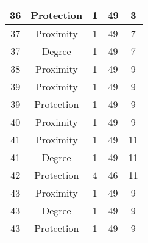 \documentclass[results.tex]{subfiles}
\begin{document}
\begin{center}
\begin{tabular}{| c || c | c | c | c |}
            \hline
            36                      & Protection                   & 1                      & 49                      & 3                    \\
            \hline
            37                      & Proximity                    & 1                      & 49                      & 7                    \\
            \hline
            37                      & Degree                       & 1                      & 49                      & 7                    \\
            \hline
            38                      & Proximity                    & 1                      & 49                      & 9                    \\
            \hline
            39                      & Proximity                    & 1                      & 49                      & 9                    \\
            \hline
            39                      & Protection                   & 1                      & 49                      & 9                    \\
            \hline
            40                      & Proximity                    & 1                      & 49                      & 9                    \\
            \hline
            41                      & Proximity                    & 1                      & 49                      & 11                   \\
            \hline
            41                      & Degree                       & 1                      & 49                      & 11                   \\
            \hline
            42                      & Protection                   & 4                      & 46                      & 11                   \\
            \hline
            43                      & Proximity                    & 1                      & 49                      & 9                    \\
            \hline
            43                      & Degree                       & 1                      & 49                      & 9                    \\
            \hline
            43                      & Protection                   & 1                      & 49                      & 9                    \\

\end{tabular}
\end{center}
\end{document}
